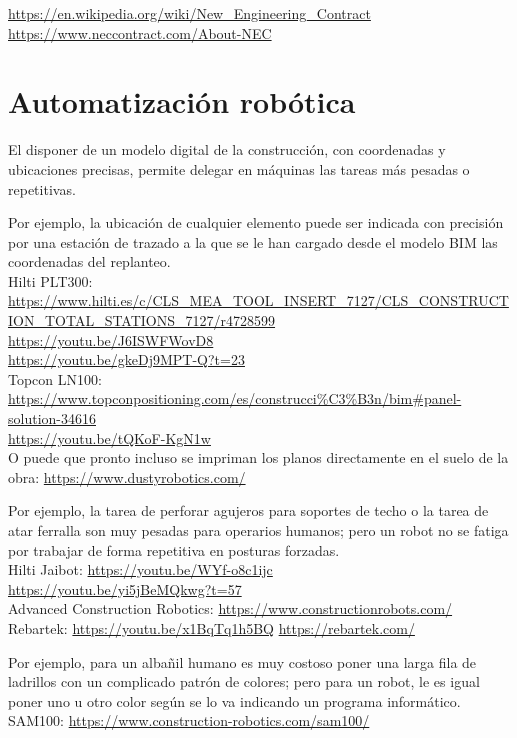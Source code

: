 \documentclass[spanish,12pt,a4paper,final,oneside]{book}
\begin{document}
\url{https://en.wikipedia.org/wiki/New_Engineering_Contract}
\\ \url{https://www.neccontract.com/About-NEC}




\section{Automatización robótica}
El disponer de un modelo digital de la construcción, con coordenadas y ubicaciones precisas, permite delegar en máquinas las tareas más pesadas o repetitivas.
\vspace{0.3cm}

Por ejemplo, la ubicación de cualquier elemento puede ser indicada con precisión por una estación de trazado a la que se le han cargado desde el modelo BIM las coordenadas del replanteo.
\\Hilti PLT300: \url{https://www.hilti.es/c/CLS_MEA_TOOL_INSERT_7127/CLS_CONSTRUCTION_TOTAL_STATIONS_7127/r4728599} 
\\ \url{https://youtu.be/J6ISWFWovD8} \hspace{1cm} 
\\ \url{https://youtu.be/gkeDj9MPT-Q?t=23}
\\Topcon LN100: \url{https://www.topconpositioning.com/es/construcci%C3%B3n/bim#panel-solution-34616}
\\ \url{https://youtu.be/tQKoF-KgN1w}
\\O puede que pronto incluso se impriman los planos directamente en el suelo de la obra: \url{https://www.dustyrobotics.com/}

Por ejemplo, la tarea de perforar agujeros para soportes de techo o la tarea de atar ferralla son muy pesadas para operarios humanos; pero un robot no se fatiga por trabajar de forma repetitiva en posturas forzadas.
\\Hilti Jaibot: \url{https://youtu.be/WYf-o8c1ijc} 
\\ \url{https://youtu.be/yi5jBeMQkwg?t=57}
\\Advanced Construction Robotics: \url{https://www.constructionrobots.com/}
\\Rebartek: \url{https://youtu.be/x1BqTq1h5BQ} \hspace{0.5cm} \url{https://rebartek.com/}

Por ejemplo, para un albañil humano es muy costoso poner una larga fila de ladrillos con un complicado patrón de colores; pero para un robot, le es igual poner uno u otro color según se lo va indicando un programa informático.
\\SAM100: \url{https://www.construction-robotics.com/sam100/}
\end{document}

